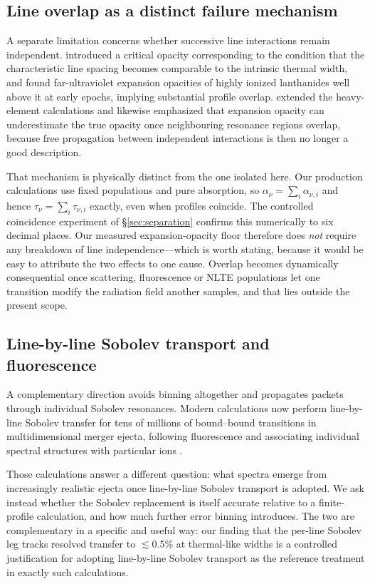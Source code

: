 \documentclass[fleqn,usenatbib]{mnras}
\begin{document}
\subsection{Line overlap as a distinct failure mechanism}

A separate limitation concerns whether successive line interactions remain
independent. \citet{banerjee2022} introduced a critical opacity corresponding
to the condition that the characteristic line spacing becomes comparable to
the intrinsic thermal width, and found far-ultraviolet expansion opacities of
highly ionized lanthanides well above it at early epochs, implying
substantial profile overlap. \citet{banerjee2024} extended the heavy-element
calculations and likewise emphasized that expansion opacity can underestimate
the true opacity once neighbouring resonance regions overlap, because free
propagation between independent interactions is then no longer a good
description.

That mechanism is physically distinct from the one isolated here. Our
production calculations use fixed populations and pure absorption, so
$\alpha_\nu = \sum_i \alpha_{\nu,i}$ and hence
$\tau_\nu = \sum_i \tau_{\nu,i}$ exactly, even when profiles coincide. The
controlled coincidence experiment of \S\ref{sec:separation} confirms this
numerically to six decimal places. Our measured expansion-opacity floor
therefore does \emph{not} require any breakdown of line independence---which
is worth stating, because it would be easy to attribute the two effects to
one cause. Overlap becomes dynamically consequential once scattering,
fluorescence or NLTE populations let one transition modify the radiation
field another samples, and that lies outside the present scope.

\subsection{Line-by-line Sobolev transport and fluorescence}

A complementary direction avoids binning altogether and propagates packets
through individual Sobolev resonances. Modern calculations now perform
line-by-line Sobolev transfer for tens of millions of bound--bound
transitions in multidimensional merger ejecta, following fluorescence and
associating individual spectral structures with particular ions
\citep{shingles2023,collins2023,collins2026}.

Those calculations answer a different question: what spectra emerge from
increasingly realistic ejecta once line-by-line Sobolev transport is adopted.
We ask instead whether the Sobolev replacement is itself accurate relative to
a finite-profile calculation, and how much further error binning introduces.
The two are complementary in a specific and useful way: our finding that the
per-line Sobolev leg tracks resolved transfer to $\lesssim0.5\%$ at
thermal-like widths is a controlled justification for adopting line-by-line
Sobolev transport as the reference treatment in exactly such calculations.
\end{document}
